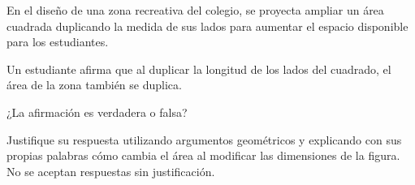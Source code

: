 En el diseño de una zona recreativa del colegio, se proyecta ampliar un área cuadrada duplicando la medida de sus lados para aumentar el espacio disponible para los estudiantes.

Un estudiante afirma que al duplicar la longitud de los lados del cuadrado, el área de la zona también se duplica.

¿La afirmación es verdadera o falsa?

Justifique su respuesta utilizando argumentos geométricos y explicando con sus propias palabras cómo cambia el área al modificar las dimensiones de la figura. No se aceptan respuestas sin justificación.